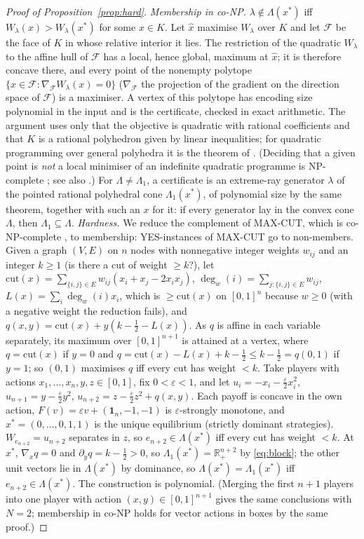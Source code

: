 \documentclass[11pt,a4paper]{article}
\theoremstyle{plain}
\theoremstyle{definition}
\theoremstyle{remark}
\newcommand{\R}{\mathbb{R}}
\newcommand{\Lam}{\Lambda}
\newcommand{\Lone}{\Lambda_{1}}
\begin{document}
\begin{proof}[Proof of Proposition~\ref{prop:hard}]
\emph{Membership in co-NP.} $\lambda\notin\Lam(x^*)$ iff $W_\lambda(x)>W_\lambda(x^*)$ for some $x\in K$. Let $\hat x$ maximise $W_\lambda$ over $K$ and let $\mathcal F$ be the face of $K$ in whose relative interior it lies. The restriction of the quadratic $W_\lambda$ to the affine hull of $\mathcal F$ has a local, hence global, maximum at $\hat x$; it is therefore concave there, and every point of the nonempty polytope $\{x\in\mathcal F:\nabla_{\mathcal F} W_\lambda(x)=0\}$ ($\nabla_{\mathcal F}$ the projection of the gradient on the direction space of $\mathcal F$) is a maximiser. A vertex of this polytope has encoding size polynomial in the input \citep[Section~10.2]{schrijver1986} and is the certificate, checked in exact arithmetic. The argument uses only that the objective is quadratic with rational coefficients and that $K$ is a rational polyhedron given by linear inequalities; for quadratic programming over general polyhedra it is the theorem of \citet{vavasis1990}. (Deciding that a given point is \emph{not} a local minimiser of an indefinite quadratic programme is NP-complete \citep{murtyKabadi1987}; see also \citet{pardalosSchnitger1988}.) For $\Lam\ne\Lone$, a certificate is an extreme-ray generator $\lambda$ of the pointed rational polyhedral cone $\Lone(x^*)$, of polynomial size by the same theorem, together with such an $x$ for it: if every generator lay in the convex cone $\Lam$, then $\Lone\subseteq\Lam$.
\emph{Hardness.} We reduce the complement of MAX-CUT, which is co-NP-complete \citep{karp1972}, to membership: YES-instances of MAX-CUT go to non-members. Given a graph $(V,E)$ on $n$ nodes with nonnegative integer weights $w_{ij}$ and an integer $k\ge1$ (is there a cut of weight $\ge k$?), let $\mathrm{cut}(x)=\sum_{\{i,j\}\in E}w_{ij}(x_i+x_j-2x_ix_j)$, $\deg_w(i)=\sum_{j:\{i,j\}\in E}w_{ij}$, $L(x)=\sum_i\deg_w(i)x_i$, which is $\ge\mathrm{cut}(x)$ on $[0,1]^n$ because $w\ge0$ (with a negative weight the reduction fails), and $q(x,y)=\mathrm{cut}(x)+y(k-\tfrac12-L(x))$. As $q$ is affine in each variable separately, its maximum over $[0,1]^{n+1}$ is attained at a vertex, where $q=\mathrm{cut}(x)$ if $y=0$ and $q=\mathrm{cut}(x)-L(x)+k-\tfrac12\le k-\tfrac12=q(0,1)$ if $y=1$; so $(0,1)$ maximises $q$ iff every cut has weight $<k$. Take players with actions $x_1,\dots,x_n,y,z\in[0,1]$, fix $0<\varepsilon<1$, and let $u_i=-x_i-\tfrac\varepsilon2x_i^2$, $u_{n+1}=y-\tfrac\varepsilon2y^2$, $u_{n+2}=z-\tfrac\varepsilon2z^2+q(x,y)$. Each payoff is concave in the own action, $F(v)=\varepsilon v+(\mathbf 1_n,-1,-1)$ is $\varepsilon$-strongly monotone, and $x^*=(0,\dots,0,1,1)$ is the unique equilibrium (strictly dominant strategies). $W_{e_{n+2}}=u_{n+2}$ separates in $z$, so $e_{n+2}\in\Lam(x^*)$ iff every cut has weight $<k$. At $x^*$, $\nabla_xq=0$ and $\partial_yq=k-\tfrac12>0$, so $\Lone(x^*)=\R^{n+2}_+$ by \eqref{eq:block}; the other unit vectors lie in $\Lam(x^*)$ by dominance, so $\Lam(x^*)=\Lone(x^*)$ iff $e_{n+2}\in\Lam(x^*)$. The construction is polynomial. (Merging the first $n+1$ players into one player with action $(x,y)\in[0,1]^{n+1}$ gives the same conclusions with $N=2$; membership in co-NP holds for vector actions in boxes by the same proof.)

\end{proof}
\end{document}

